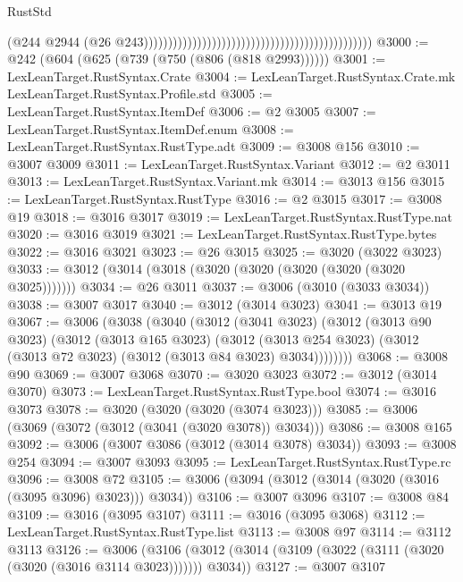 \begin{lexlean}{RustStd}
\begin{coremodule}
                                                                                              (@244
                                                                                                @2944
                                                                                                (@26
                                                                                                  @243)))))))))))))))))))))))))))))))))))))))))))))))
@3000 := @242 (@604 (@625 (@739 (@750 (@806 (@818 @2993))))))
@3001 := LexLeanTarget.RustSyntax.Crate
@3004 := LexLeanTarget.RustSyntax.Crate.mk LexLeanTarget.RustSyntax.Profile.std
@3005 := LexLeanTarget.RustSyntax.ItemDef
@3006 := @2 @3005
@3007 := LexLeanTarget.RustSyntax.ItemDef.enum
@3008 := LexLeanTarget.RustSyntax.RustType.adt
@3009 := @3008 @156
@3010 := @3007 @3009
@3011 := LexLeanTarget.RustSyntax.Variant
@3012 := @2 @3011
@3013 := LexLeanTarget.RustSyntax.Variant.mk
@3014 := @3013 @156
@3015 := LexLeanTarget.RustSyntax.RustType
@3016 := @2 @3015
@3017 := @3008 @19
@3018 := @3016 @3017
@3019 := LexLeanTarget.RustSyntax.RustType.nat
@3020 := @3016 @3019
@3021 := LexLeanTarget.RustSyntax.RustType.bytes
@3022 := @3016 @3021
@3023 := @26 @3015
@3025 := @3020 (@3022 @3023)
@3033 := @3012 (@3014 (@3018 (@3020 (@3020 (@3020 (@3020 (@3020 @3025)))))))
@3034 := @26 @3011
@3037 := @3006 (@3010 (@3033 @3034))
@3038 := @3007 @3017
@3040 := @3012 (@3014 @3023)
@3041 := @3013 @19
@3067 := @3006
    (@3038
      (@3040
        (@3012
          (@3041 @3023)
          (@3012
            (@3013 @90 @3023)
            (@3012
              (@3013 @165 @3023)
              (@3012
                (@3013 @254 @3023)
                (@3012 (@3013 @72 @3023) (@3012 (@3013 @84 @3023) @3034))))))))
@3068 := @3008 @90
@3069 := @3007 @3068
@3070 := @3020 @3023
@3072 := @3012 (@3014 @3070)
@3073 := LexLeanTarget.RustSyntax.RustType.bool
@3074 := @3016 @3073
@3078 := @3020 (@3020 (@3020 (@3074 @3023)))
@3085 := @3006 (@3069 (@3072 (@3012 (@3041 (@3020 @3078)) @3034)))
@3086 := @3008 @165
@3092 := @3006 (@3007 @3086 (@3012 (@3014 @3078) @3034))
@3093 := @3008 @254
@3094 := @3007 @3093
@3095 := LexLeanTarget.RustSyntax.RustType.rc
@3096 := @3008 @72
@3105 := @3006 (@3094 (@3012 (@3014 (@3020 (@3016 (@3095 @3096) @3023))) @3034))
@3106 := @3007 @3096
@3107 := @3008 @84
@3109 := @3016 (@3095 @3107)
@3111 := @3016 (@3095 @3068)
@3112 := LexLeanTarget.RustSyntax.RustType.list
@3113 := @3008 @97
@3114 := @3112 @3113
@3126 := @3006
    (@3106 (@3012 (@3014 (@3109 (@3022 (@3111 (@3020 (@3020 (@3016 @3114 @3023))))))) @3034))
@3127 := @3007 @3107

\end{coremodule}
\end{lexlean}
